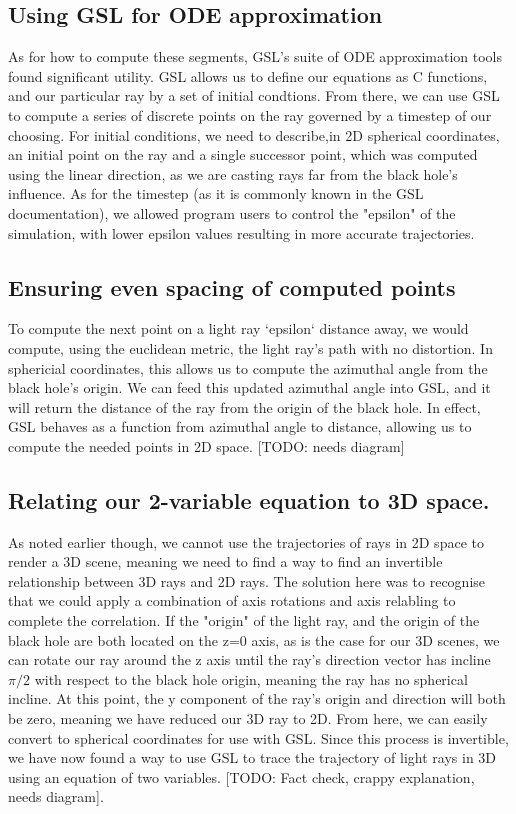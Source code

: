 \subsection {Using GSL for ODE approximation}
As for how to compute these segments, GSL's suite of ODE approximation tools found significant utility. GSL allows us to define our equations as C functions, and our particular ray by a set of initial condtions. From there, we can use GSL to compute a series of discrete points on the ray governed by a timestep of our choosing. For initial conditions, we need to describe,in 2D spherical coordinates, an initial point on the ray and a single successor point, which was computed using the linear direction, as we are casting rays far from the black hole's influence. As for the timestep (as it is commonly known in the GSL documentation), we allowed program users to control the "epsilon" of the simulation, with lower epsilon values resulting in more accurate trajectories. 

\subsection {Ensuring even spacing of computed points}
To compute the next point on a light ray `epsilon` distance away, we would compute, using the euclidean metric, the light ray's path with no distortion. In sphericial coordinates, this allows us to compute the azimuthal angle from the black hole's origin. We can feed this updated azimuthal angle into GSL, and it will return the distance of the ray from the origin of the black hole. In effect, GSL behaves as a function from azimuthal angle to distance, allowing us to compute the needed points in 2D space.  [TODO: needs diagram]

\subsection {Relating our 2-variable equation to 3D space.}
As noted earlier though, we cannot use the trajectories of rays in 2D space to render a 3D scene, meaning we need to find a way to find an invertible relationship between 3D rays and 2D rays. The solution here was to recognise that we could apply a combination of axis rotations and axis relabling to complete the correlation. If the "origin" of the light ray, and the origin of the black hole are both located on the z=0 axis, as is the case for our 3D scenes, we can rotate our ray around the z axis until the ray's direction vector has incline $ \pi / 2 $ with respect to the black hole origin, meaning the ray has no spherical incline. At this point, the y component of the ray's origin and direction will both be zero, meaning we have reduced our 3D ray to 2D. From here, we can easily convert to spherical coordinates for use with GSL. Since this process is invertible, we have now found a way to use GSL to trace the trajectory of light rays in 3D using an equation of two variables. [TODO: Fact check, crappy explanation, needs diagram].


